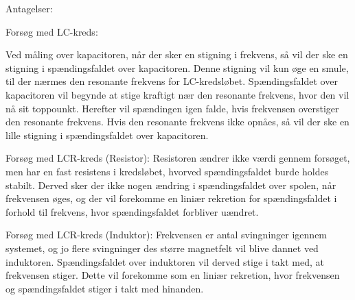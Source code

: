 Antagelser:

Forsøg med LC-kreds:

Ved måling over kapacitoren, når der sker en stigning i frekvens, så vil der ske en stigning i spændingsfaldet over kapacitoren. Denne stigning vil kun øge en smule, til der nærmes den resonante frekvens for LC-kredsløbet. Spændingsfaldet over kapacitoren vil begynde at stige kraftigt nær den resonante frekvens, hvor den vil nå sit toppounkt. Herefter vil spændingen igen falde, hvis frekvensen overstiger den resonante frekvens. Hvis den resonante frekvens ikke opnåes, så vil der ske en lille stigning i spændingsfaldet over kapacitoren.

Forsøg med LCR-kreds (Resistor):
Resistoren ændrer ikke værdi gennem forsøget, men har en fast resistens i kredsløbet, hvorved spændingsfaldet burde holdes stabilt. Derved sker der ikke nogen ændring i spændingsfaldet over spolen, når frekvensen øges, og der vil forekomme en liniær rekretion for spændingsfaldet i forhold til frekvens, hvor spændingsfaldet forbliver uændret.

Forsøg med LCR-kreds (Induktor):
Frekvensen er antal svingninger igennem systemet, og jo flere svingninger des større magnetfelt vil blive dannet ved induktoren. Spændingsfaldet over induktoren vil derved stige i takt med, at frekvensen stiger. Dette vil forekomme som en liniær rekretion, hvor frekvensen og spændingsfaldet stiger i takt med hinanden.